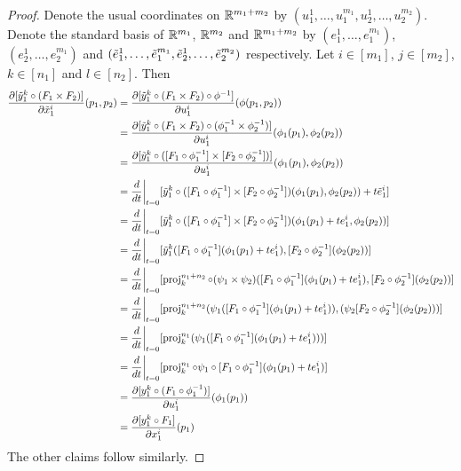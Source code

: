 \documentclass{book}
\begin{document}
	\begin{proof}
		Denote the usual coordinates on $\mathbb{R}^{m_1 + m_2}$ by $(u_1^1, \ldots, u_1^{m_1}, u_2^1, \ldots, u_2^{m_2})$. Denote the standard basis of $\mathbb{R}^{m_1}$, $\mathbb{R}^{m_2}$ and $\mathbb{R}^{m_1 + m_2}$ by $(e^1_1, \ldots, e^{m_1}_1)$, $(e^1_2, \ldots, e^{m_1}_2)$ and $(\tilde{e}^1_1, \ldots, \tilde{e}^{m_1}_1, \tilde{e}^1_2, \ldots, \tilde{e}^{m_2}_2)$ respectively. Let $i \in [m_1]$, $j \in [m_2]$, $k \in [n_1]$ and $l \in [n_2]$. Then 
		\begin{align*}
			\frac{\partial [\tilde{y}_1^k \circ (F_1 \times F_2)]}{\partial \tilde{x}_1^i}(p_1, p_2)
			& = \frac{\partial [\tilde{y}_1^k \circ (F_1 \times F_2) \circ \phi^{-1}]}{\partial u_1^i}  (\phi(p_1, p_2) ) \\
			& = \frac{\partial [\tilde{y}_1^k \circ (F_1 \times F_2) \circ (\phi_1^{-1} \times \phi_2^{-1})]}{\partial u_1^i}  (\phi_1(p_1), \phi_2 (p_2) ) \\
			& = \frac{\partial [\tilde{y}_1^k \circ ([F_1 \circ \phi_1^{-1}] \times [F_2 \circ \phi_2^{-1}]) ]}{\partial u_1^i}  (\phi_1(p_1), \phi_2 (p_2) ) \\
			& = \frac{d}{d t} \bigg|_{t = 0} [\tilde{y}_1^k \circ ([F_1 \circ \phi_1^{-1}] \times [F_2 \circ \phi_2^{-1}]) (\phi_1(p_1), \phi_2 (p_2)) + t\tilde{e}_1^i] \\
			& = \frac{d}{d t} \bigg|_{t = 0} [\tilde{y}_1^k \circ ([F_1 \circ \phi_1^{-1}] \times [F_2 \circ \phi_2^{-1}]) (\phi_1(p_1) + te^i_1, \phi_2 (p_2))] \\
			& = \frac{d}{d t} \bigg|_{t = 0} [\tilde{y}_1^k ([F_1 \circ \phi_1^{-1}](\phi_1(p_1) + te^i_1) , [F_2 \circ \phi_2^{-1}](\phi_2 (p_2))] \\
			& = \frac{d}{d t} \bigg|_{t = 0} [\operatorname{\text{proj}}^{n_1 + n_2}_k \circ( \psi_1 \times \psi_2) ([F_1 \circ \phi_1^{-1}](\phi_1(p_1) + te^i_1) , [F_2 \circ \phi_2^{-1}](\phi_2 (p_2))] \\
			& = \frac{d}{d t} \bigg|_{t = 0} [\operatorname{\text{proj}}^{n_1 + n_2}_k ( \psi_1 ([F_1 \circ \phi_1^{-1}](\phi_1(p_1) + te^i_1)) , (\psi_2[F_2 \circ \phi_2^{-1}](\phi_2 (p_2)))] \\
			& = \frac{d}{d t} \bigg|_{t = 0} [\operatorname{\text{proj}}^{n_1}_k ( \psi_1 ([F_1 \circ \phi_1^{-1}](\phi_1(p_1) + te^i_1)))] \\
			& = \frac{d}{d t} \bigg|_{t = 0} [ \operatorname{\text{proj}}^{n_1}_k \circ \psi_1  \circ [F_1 \circ \phi_1^{-1}](\phi_1(p_1) + te^i_1)] \\
			& = \frac{\partial [y_1^k \circ (F_1 \circ \phi_1^{-1})]}{\partial u_1^i} (\phi_1(p_1) ) \\
			& = \frac{\partial [y_1^k \circ F_1]}{\partial x_1^i} (p_1) 
		\end{align*}
		The other claims follow similarly. 
	\end{proof}
	
\end{document}
